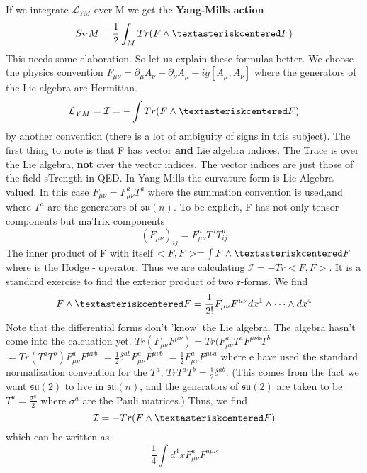 \documentclass[12pt, oneside, a4paper]{article}
\theoremstyle{definition}
\begin{document}
If we integrate $\mathcal{L}_{YM}$ over M we get the \textbf{Yang-Mills action}
\begin{equation}
 S_YM = \frac{1}{2} \int_M Tr (F \wedge \textasteriskcentered F)
\end{equation}
This needs some elaboration. So let us explain these formulas better.
We choose the physics convention $F_{\mu \nu} = \partial_\mu A_\nu - \partial_\nu A_\mu -ig[A_\mu,A_\nu]$
where the generators of the Lie algebra are Hermitian.
\begin{equation}
 \mathcal{L}_{YM} = \mathcal{I} = - \int Tr(F \wedge \textasteriskcentered F)
\end{equation}
by another convention (there is a lot of ambiguity of signs in this subject).
The first thing to note is that F has vector \textbf{and} Lie algebra indices. The Trace is over the Lie algebra, \textbf{not}
over the vector indices. The vector indices are just those of the field sTrength in QED. In Yang-Mills the curvature
form is Lie Algebra valued.
   \newline In this case $F_{\mu \nu} = F^{a}_{\mu \nu}T^a$ where the summation convention is used,and where $T^a$ are the 
generators of $\mathfrak{su}(n)$. To be explicit, F has not only tensor components but maTrix components
\begin{equation*}
 (F_{\mu \nu})_{ij} = F^{a}_{\mu \nu}T^a T^a_{ij}
\end{equation*}
The inner product of F with itself $<F,F> = \int F \wedge \textasteriskcentered F$ 
where \textasteriskcentered is the Hodge \textasteriskcentered - operator. Thus we are calculating 
$\mathcal{I} = -Tr<F,F>$. It is a standard exercise to find the exterior product of two r-forms. We find
\begin{equation*}
 F \wedge \textasteriskcentered F = \frac{1}{2!}F_{\mu \nu}F^{\mu \nu} dx^1 \wedge \cdots \wedge dx^4
\end{equation*}
Note that the differential forms don't 'know' the Lie algebra. 
The algebra hasn't come into the calcuation yet.
$Tr(F_{\mu \nu}F^{\mu \nu})=Tr(F^{a}_{\mu \nu}T^aF^{\mu \nu b}T^b$
$= Tr(T^aT^b)F^{a}_{\mu \nu}F^{\mu \nu b}$
$= \frac{1}{2}\delta^{ab}F^{a}_{\mu \nu}F^{\mu \nu b}$
$=\frac{1}{2}F^{a}_{\mu \nu}F^{\mu \nu a}$
where e have used the standard normalization convention for the $T^a$, $Tr T^a T^b = \frac{1}{2}\delta^{ab}$. (This comes from the
fact we want $\mathfrak{su}(2)$ to live in $\mathfrak{su}(n)$, and the generators of $\mathfrak{su}(2)$  are taken 
to be $T^a = \frac{\sigma^a}{2}$ where $\sigma^a$ are the Pauli matrices.) Thus, we find
\begin{equation*}
 \mathcal{I} = - Tr (F \wedge \textasteriskcentered F)
\end{equation*}
which can be written as 
\begin{equation*}
 \frac{1}{4} \int d^4 x F^{a}_{\mu \nu}F^{a \mu \nu}
\end{equation*}
\end{document}
